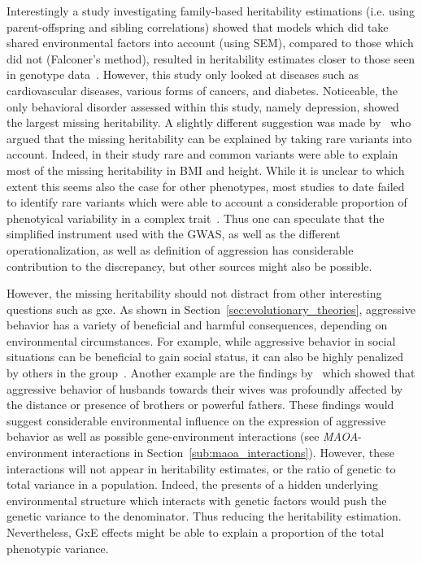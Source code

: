 Interestingly a study investigating family-based heritability estimations (i.e. using parent-offspring and sibling correlations) showed that models which did take shared environmental factors into account (using SEM), compared to those which did not (Falconer's method), resulted in heritability estimates closer to those seen in genotype data~\citet{Munoz2016a}.
However, this study only looked at diseases such as cardiovascular diseases, various forms of cancers, and diabetes.
Noticeable, the only behavioral  disorder assessed within this study, namely depression, showed the largest missing heritability.
A slightly different suggestion was made by~\citet{Yang2015} who argued that the missing heritability can be explained by taking rare variants into account.
Indeed, in their study rare and common variants were able to explain most of the missing heritability in BMI and height.
While it is unclear to which extent this seems also the case for other phenotypes, most studies to date failed to identify rare variants which were able to account a considerable proportion of phenotyical variability in a complex trait~\cite{Chabris2015,Wray2011}.
Thus one can speculate that the simplified instrument used with the GWAS, as well as the different operationalization, as well as definition of aggression has considerable contribution to the discrepancy, but other sources might also be possible.

However, the missing heritability should not distract from other interesting questions such as \acrfull{gxe}.
As shown in Section~\ref{sec:evolutionary_theories}, aggressive behavior has a variety of beneficial and harmful consequences, depending on environmental circumstances. 
For example, while aggressive behavior in social situations can be beneficial to gain social status, it can also be highly penalized by others in the group~\cite{Buss1997}.
Another example are the findings by~\citet{Figueredo1995} which showed that aggressive behavior of husbands towards their wives was profoundly affected by the distance or presence of brothers or powerful fathers.
These findings would suggest considerable environmental influence on the expression of aggressive behavior as well as possible gene-environment interactions (see \textit{MAOA}-environment interactions in Section~\ref{sub:maoa_interactions}).
However, these interactions will not appear in heritability estimates, or the ratio of genetic to total variance in a population.
Indeed, the presents of a hidden underlying environmental structure which interacts with genetic factors would push the genetic variance to the denominator.
Thus reducing the heritability estimation.
Nevertheless, GxE effects might be able to explain a proportion of the total phenotypic variance.

